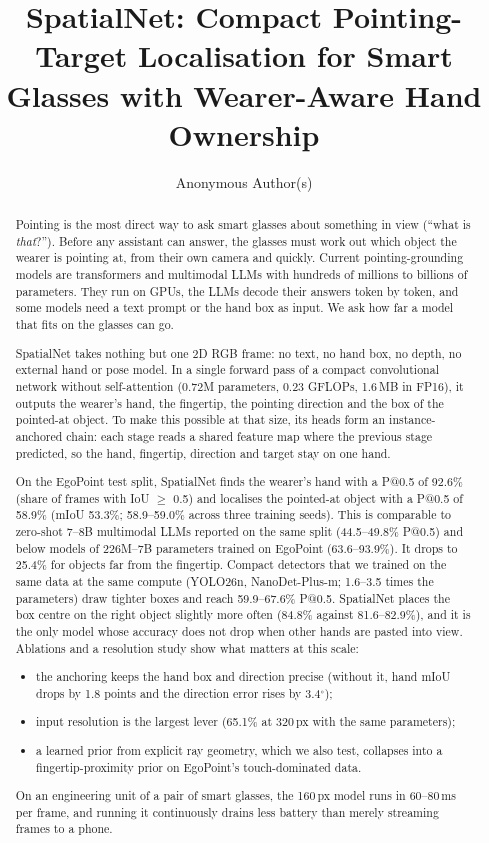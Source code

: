 \documentclass[acmsmall,screen,review,anonymous]{acmart}
\begin{document}
\title[SpatialNet]{SpatialNet: Compact Pointing-Target Localisation
for Smart Glasses with Wearer-Aware Hand Ownership}

\author{Anonymous Author(s)}

\begin{abstract}
Pointing is the most direct way to ask smart glasses about something in view (``what is \emph{that}?''). Before any assistant can answer, the glasses must work out which object the wearer is pointing at, from their own camera and quickly. Current pointing-grounding models are transformers and multimodal LLMs with hundreds of millions to billions of parameters. They run on GPUs, the LLMs decode their answers token by token, and some models need a text prompt or the hand box as input. We ask how far a model that fits on the glasses can go.

SpatialNet takes nothing but one 2D RGB frame: no text, no hand box, no depth, no external hand or pose model. In a single forward pass of a compact convolutional network without self-attention (0.72M parameters, 0.23 GFLOPs, 1.6\,MB in FP16), it outputs the wearer's hand, the fingertip, the pointing direction and the box of the pointed-at object. To make this possible at that size, its heads form an instance-anchored chain: each stage reads a shared feature map where the previous stage predicted, so the hand, fingertip, direction and target stay on one hand.

On the EgoPoint test split, SpatialNet finds the wearer's hand with a P@0.5 of 92.6\% (share of frames with IoU $\geq$ 0.5) and localises the pointed-at object with a P@0.5 of 58.9\% (mIoU 53.3\%; 58.9--59.0\% across three training seeds). This is comparable to zero-shot 7--8B multimodal LLMs reported on the same split (44.5--49.8\% P@0.5) and below models of 226M--7B parameters trained on EgoPoint (63.6--93.9\%). It drops to 25.4\% for objects far from the fingertip. Compact detectors that we trained on the same data at the same compute (YOLO26n, NanoDet-Plus-m; 1.6--3.5 times the parameters) draw tighter boxes and reach 59.9--67.6\% P@0.5. SpatialNet places the box centre on the right object slightly more often (84.8\% against 81.6--82.9\%), and it is the only model whose accuracy does not drop when other hands are pasted into view. Ablations and a resolution study show what matters at this scale:
\begin{itemize}
\item the anchoring keeps the hand box and direction precise (without it, hand mIoU drops by 1.8 points and the direction error rises by 3.4$^\circ$);
\item input resolution is the largest lever (65.1\% at 320\,px with the same parameters);
\item a learned prior from explicit ray geometry, which we also test, collapses into a fingertip-proximity prior on EgoPoint's touch-dominated data.
\end{itemize}
On an engineering unit of a pair of smart glasses, the 160\,px model runs in 60--80\,ms per frame, and running it continuously drains less battery than merely streaming frames to a phone.
\end{abstract}
\end{document}
